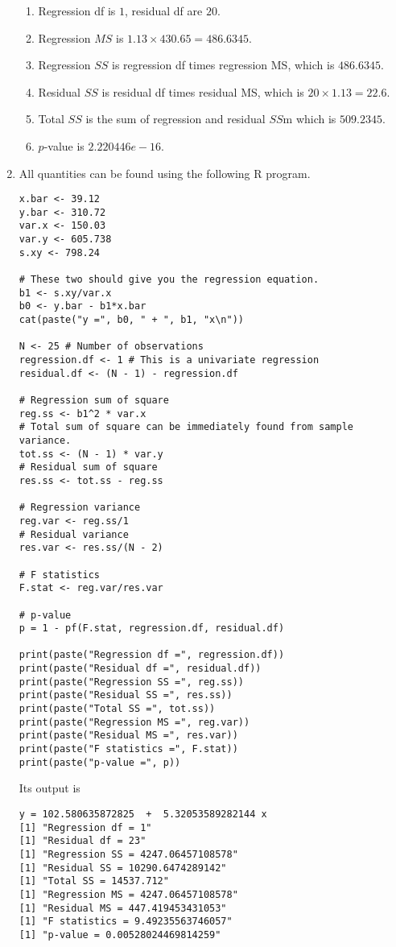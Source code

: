 \documentclass{article}
\begin{document}
\begin{enumerate}
\begin{enumerate}
\item Regression df is $1$, residual df are $20$.
\item Regression $MS$ is $1.13 \times 430.65 = 486.6345$.
\item Regression $SS$ is regression df times regression MS, which is $486.6345$.
\item Residual $SS$ is residual df times residual MS, which is $20 \times 1.13 = 22.6$.
\item Total $SS$ is the sum of regression and residual $SS$m which is $509.2345$.
\item $p$-value is $2.220446e-16$.
\end{enumerate}

\item All quantities can be found using the following R program.
\begin{verbatim}
x.bar <- 39.12
y.bar <- 310.72
var.x <- 150.03
var.y <- 605.738
s.xy <- 798.24

# These two should give you the regression equation.
b1 <- s.xy/var.x
b0 <- y.bar - b1*x.bar
cat(paste("y =", b0, " + ", b1, "x\n"))

N <- 25 # Number of observations
regression.df <- 1 # This is a univariate regression
residual.df <- (N - 1) - regression.df

# Regression sum of square
reg.ss <- b1^2 * var.x
# Total sum of square can be immediately found from sample variance.
tot.ss <- (N - 1) * var.y
# Residual sum of square
res.ss <- tot.ss - reg.ss

# Regression variance
reg.var <- reg.ss/1
# Residual variance
res.var <- res.ss/(N - 2)

# F statistics
F.stat <- reg.var/res.var

# p-value
p = 1 - pf(F.stat, regression.df, residual.df)

print(paste("Regression df =", regression.df))
print(paste("Residual df =", residual.df))
print(paste("Regression SS =", reg.ss))
print(paste("Residual SS =", res.ss))
print(paste("Total SS =", tot.ss))
print(paste("Regression MS =", reg.var))
print(paste("Residual MS =", res.var))
print(paste("F statistics =", F.stat))
print(paste("p-value =", p))
\end{verbatim}
Its output is
\begin{verbatim}
y = 102.580635872825  +  5.32053589282144 x
[1] "Regression df = 1"
[1] "Residual df = 23"
[1] "Regression SS = 4247.06457108578"
[1] "Residual SS = 10290.6474289142"
[1] "Total SS = 14537.712"
[1] "Regression MS = 4247.06457108578"
[1] "Residual MS = 447.419453431053"
[1] "F statistics = 9.49235563746057"
[1] "p-value = 0.00528024469814259"
\end{verbatim}
\end{enumerate}
\end{document}
